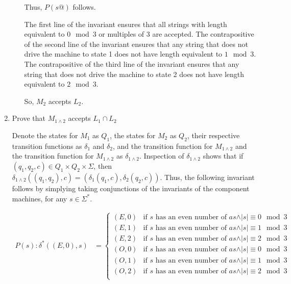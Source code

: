 \documentclass[12pt]{article}
\begin{document}
\begin{enumerate}[1.]
\begin{enumerate}[1.]
\begin{mdframed}
            \bigskip

            Thus, $P(s@)$ follows.

            \bigskip

            The first line of the invariant ensures that all strings with length
            equivalent to $0 \mod 3$ or multiples of 3 are accepted. The contrapositive
            of the second line of the invariant ensures that any string that does
            not drive the machine to state 1 does not have length equivalent to
            $1 \mod 3$. The contrapositive of the third line of the invariant
            ensures that any string that does not drive the machine to state 2 does
            not have length equivalent to $2 \mod 3$.

            \bigskip

            So, $M_2$ accepts $L_2$.
        \end{mdframed}

    \end{enumerate}

    \item Prove that $M_{1\land2}$ accepts $L_1 \cap L_2$

    \bigskip

    Denote the states for $M_1$ as $Q_1$, the states for $M_2$ as $Q_2$, their
    respective transition functions as $\delta_1$ and $\delta_2$, and the transition
    function for $M_{1\land 2}$ and the transition function for $M_{1\land 2}$ as $\delta_{1 \land 2}$.
    Inspection of $\delta_{1 \land 2}$ shows that if $(q_1,q_2,c) \in Q_1 \times Q_2 \times \Sigma$,
    then $\delta_{1\land 2}((q_1,q_2),c) = (\delta_1(q_1,c),\delta_2(q_2,c))$. Thus,
    the following invariant follows by simplying taking conjunctions of the invariants
    of the component machines, for any $s \in \Sigma^*$.

    \begin{align}
        P(s):\delta^*((E,0),s) &= \begin{cases}
            (E,0) & \text{if $s$ has an even number of $as \land \vert s \vert \equiv 0 \mod 3$}\\
            (E,1) & \text{if $s$ has an even number of $as \land \vert s \vert \equiv 1 \mod 3$}\\
            (E,2) & \text{if $s$ has an even number of $as \land \vert s \vert \equiv 2 \mod 3$}\\
            (O,0) & \text{if $s$ has an even number of $as \land \vert s \vert \equiv 0 \mod 3$}\\
            (O,1) & \text{if $s$ has an even number of $as \land \vert s \vert \equiv 1 \mod 3$}\\
            (O,2) & \text{if $s$ has an even number of $as \land \vert s \vert \equiv 2 \mod 3$}\\
        \end{cases}
    \end{align}


\end{enumerate}
\end{document}
